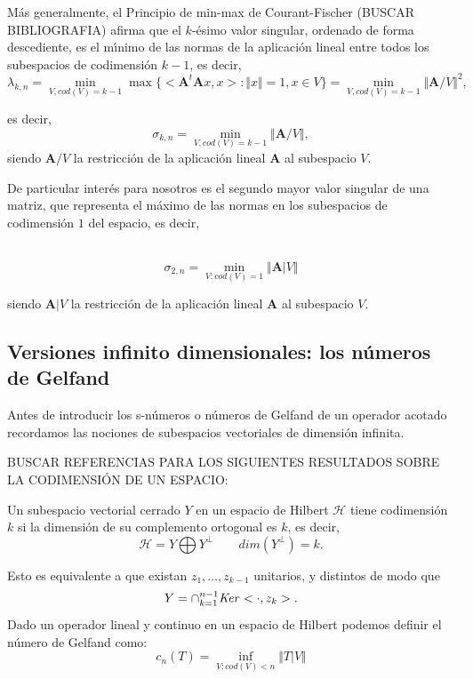 \documentclass[12pt,a4paper]{article}
\begin{document}
\noindent M\'{a}s generalmente, 
el Principio de min-max de  Courant-Fischer  (BUSCAR BIBLIOGRAFIA) afirma que el $k$-\'{e}simo valor singular, ordenado de forma descediente, es el m\'{\i}nimo de las normas de la aplicaci\'{o}n lineal entre todos los subespacios de codimensi\'{o}n $k-1$, es decir, 
$$
\lambda_{k,n}= \min_{V, cod(V)=k-1}  \max \{<\mathbf{A}^{t}\mathbf{A}x,x>: \Vert x \Vert =1,x\in V \}= \min_{V, cod(V)=k-1} \Vert \mathbf{A}/V\Vert^{2},
$$

\noindent es decir, 
$$
\sigma_{k,n}=  \min_{V, cod(V)=k-1} \Vert \mathbf{A}/V\Vert,
$$
siendo $\mathbf{A}/V$ la restricci\'on de la aplicaci\'on lineal $\mathbf{A}$ al subespacio $V$. 

\noindent De particular inter\'{e}s para nosotros es el segundo mayor valor singular de una matriz, que representa el m\'{a}ximo de las normas en los subespacios de codimensi\'{o}n $1$ del espacio, es decir, 

\ 
$$
\sigma_{2,n} =  \min_{V: cod(V)=1} \Vert \mathbf{A}\vert V \Vert 
$$

\noindent siendo $\mathbf{A}\vert V$ la restricci\'{o}n de la aplicaci\'{o}n lineal $\mathbf{A}$ al subespacio $V$. 


\subsection{Versiones infinito dimensionales: los n\'{u}meros de Gelfand} 

\noindent Antes de introducir los s-números o números de Gelfand de un operador acotado recordamos las nociones de subespacios vectoriales de dimensión infinita. 

\noindent BUSCAR REFERENCIAS PARA LOS SIGUIENTES RESULTADOS SOBRE LA CODIMENSIÓN DE UN ESPACIO: 

\noindent Un subespacio vectorial cerrado $Y$ en un espacio de Hilbert $\mathcal{H}$ tiene codimensión $k$ si la dimensión de su complemento ortogonal es $k$, es decir, 
$$
\mathcal{H}= Y \bigoplus Y^{\perp} \qquad dim(Y^{\perp})=k.
$$

\noindent Esto es equivalente a que existan $z_1,\dots,z_{k-1}$ unitarios, y distintos de modo que 
$$
Y=\cap_{k=1}^{n-1} {\it Ker}<\cdot,z_k>.
$$
\noindent 
\noindent Dado un operador lineal y continuo en un espacio de Hilbert  podemos definir el n\'{u}mero de Gelfand como:
$$
c_n(T)=\inf_{V: cod(V)<n} \Vert T\vert V \Vert 
$$
\end{document}
